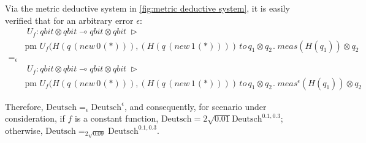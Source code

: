   Via the metric deductive system in \autoref{fig:metric deductive system}, it is easily verified that for an arbitrary error $\epsilon$:
  \begin{align*}
     & \hspace{3pt} U_{f}: \textit{qbit} \otimes \textit{qbit} \multimap \textit{qbit} \otimes \textit{qbit} \hspace{3pt} \triangleright \hspace{3pt}  \\ 
    & \text{pm} \hspace{4pt}  U_{f}(H(q  \hspace{2pt}   ( \textit{new}   \hspace{2pt}  0 \hspace{1pt}(*))),(H(q  \hspace{2pt}   ( \textit{new}   \hspace{2pt}  1 \hspace{1pt}(*)))) \hspace{2pt}  \textit{to} \hspace{2pt} q_{1} \otimes q_{2} \hspace{1pt}. \hspace{3pt} \textit{meas} (H( q_{1})) \otimes q_{2} \\
    =_{\epsilon}& \\
     & \hspace{3pt} U_{f}: \textit{qbit} \otimes \textit{qbit} \multimap \textit{qbit} \otimes \textit{qbit} \hspace{3pt} \triangleright \hspace{3pt}  \\ 
    & \text{pm} \hspace{4pt}  U_{f}(H(q  \hspace{2pt}   ( \textit{new}   \hspace{2pt}  0 \hspace{1pt}(*))),(H(q  \hspace{2pt}   ( \textit{new}   \hspace{2pt}  1 \hspace{1pt}(*)))) \hspace{2pt}  \textit{to} \hspace{2pt} q_{1} \otimes q_{2} \hspace{1pt}. \hspace{3pt} \textit{meas}^{\epsilon} (H( q_{1})) \otimes q_{2}
     \end{align*}
  
  Therefore, $\text{Deutsch}=_{\epsilon} \text{Deutsch}^{\epsilon}$, and consequently, for scenario under consideration, if $f$ is a constant function, $\text{Deutsch} ={2 \sqrt{0.01}} \text{Deutsch}^{0.1,0.3}$; otherwise, $\text{Deutsch} =_{2 \sqrt{0.09}} \text{Deutsch}^{0.1,0.3}$.

